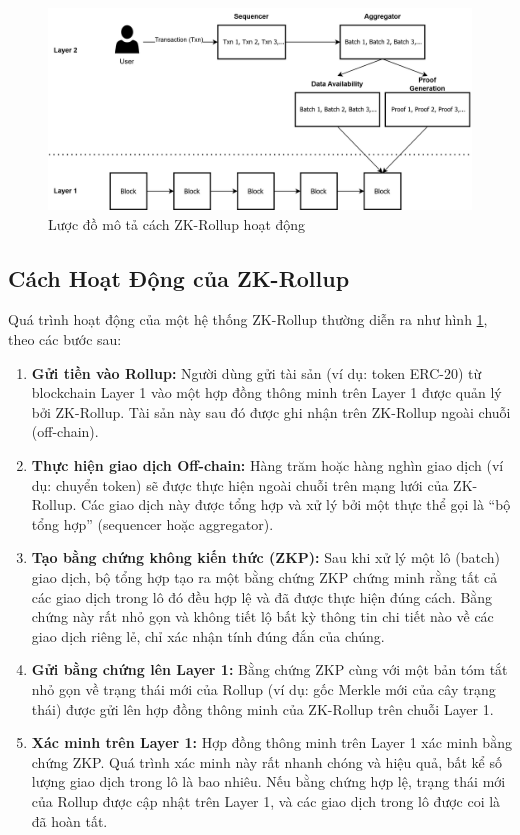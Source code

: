 \begin{figure}[H]
    \centering
    \includegraphics[width = \textwidth]{imgs/ZKRollup.png}
    \caption{Lược đồ mô tả cách ZK-Rollup hoạt động}
    \label{fig:chapter3-ZKRollup}
\end{figure}

\subsection{Cách Hoạt Động của ZK-Rollup}
Quá trình hoạt động của một hệ thống ZK-Rollup thường diễn ra như hình \ref{fig:chapter3-ZKRollup}, theo các bước sau:

\begin{enumerate}
    \item \textbf{Gửi tiền vào Rollup:} Người dùng gửi tài sản (ví dụ: token ERC-20) từ blockchain Layer 1 vào một hợp đồng thông minh trên Layer 1 được quản lý bởi ZK-Rollup. Tài sản này sau đó được ghi nhận trên ZK-Rollup ngoài chuỗi (off-chain).

    \item \textbf{Thực hiện giao dịch Off-chain:} Hàng trăm hoặc hàng nghìn giao dịch (ví dụ: chuyển token) sẽ được thực hiện ngoài chuỗi trên mạng lưới của ZK-Rollup. Các giao dịch này được tổng hợp và xử lý bởi một thực thể gọi là ``bộ tổng hợp'' (sequencer hoặc aggregator).

    \item \textbf{Tạo bằng chứng không kiến thức (ZKP):} Sau khi xử lý một lô (batch) giao dịch, bộ tổng hợp tạo ra một bằng chứng ZKP chứng minh rằng tất cả các giao dịch trong lô đó đều hợp lệ và đã được thực hiện đúng cách. Bằng chứng này rất nhỏ gọn và không tiết lộ bất kỳ thông tin chi tiết nào về các giao dịch riêng lẻ, chỉ xác nhận tính đúng đắn của chúng.

    \item \textbf{Gửi bằng chứng lên Layer 1:} Bằng chứng ZKP cùng với một bản tóm tắt nhỏ gọn về trạng thái mới của Rollup (ví dụ: gốc Merkle mới của cây trạng thái) được gửi lên hợp đồng thông minh của ZK-Rollup trên chuỗi Layer 1.

    \item \textbf{Xác minh trên Layer 1:} Hợp đồng thông minh trên Layer 1 xác minh bằng chứng ZKP. Quá trình xác minh này rất nhanh chóng và hiệu quả, bất kể số lượng giao dịch trong lô là bao nhiêu. Nếu bằng chứng hợp lệ, trạng thái mới của Rollup được cập nhật trên Layer 1, và các giao dịch trong lô được coi là đã hoàn tất.
\end{enumerate}

